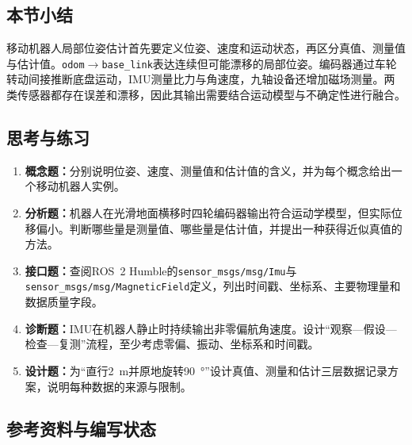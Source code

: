 \documentclass[UTF8,zihao=-4]{ctexart}
\begin{document}
\subsection*{本节小结}

移动机器人局部位姿估计首先要定义位姿、速度和运动状态，再区分真值、测量值与估计值。\texttt{odom}$\rightarrow$\texttt{base\_link}表达连续但可能漂移的局部位姿。编码器通过车轮转动间接推断底盘运动，IMU测量比力与角速度，九轴设备还增加磁场测量。两类传感器都存在误差和漂移，因此其输出需要结合运动模型与不确定性进行融合。

\subsection*{思考与练习}

\begin{enumerate}
  \item \textbf{概念题：}分别说明位姿、速度、测量值和估计值的含义，并为每个概念给出一个移动机器人实例。
  \item \textbf{分析题：}机器人在光滑地面横移时四轮编码器输出符合运动学模型，但实际位移偏小。判断哪些量是测量值、哪些量是估计值，并提出一种获得近似真值的方法。
  \item \textbf{接口题：}查阅ROS~2 Humble的\texttt{sensor\_msgs/msg/Imu}与\texttt{sensor\_msgs/msg/MagneticField}定义，列出时间戳、坐标系、主要物理量和数据质量字段。
  \item \textbf{诊断题：}IMU在机器人静止时持续输出非零偏航角速度。设计“观察---假设---检查---复测”流程，至少考虑零偏、振动、坐标系和时间戳。
  \item \textbf{设计题：}为“直行\SI{2}{m}并原地旋转\SI{90}{\degree}”设计真值、测量和估计三层数据记录方案，说明每种数据的来源与限制。
\end{enumerate}

\subsection*{参考资料与编写状态}
\end{document}
